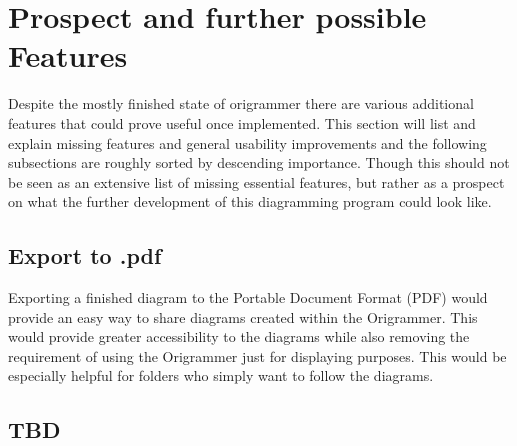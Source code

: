 
\section{Prospect and further possible Features}
\label{sec:prospect}

Despite the mostly finished state of \gls{origrammer} there are various additional features that could prove useful once implemented. This section will list and explain missing features and general usability improvements and the following subsections are roughly sorted by descending importance. Though this should not be seen as an extensive list of missing essential features, but rather as a prospect on what the further development of this diagramming program could look like. 

\subsection{Export to .pdf}

Exporting a finished diagram to the Portable Document Format (PDF) would provide an easy way to share diagrams created within the Origrammer. This would provide greater accessibility to the diagrams while also removing the requirement of using the Origrammer just for displaying purposes. This would be especially helpful for folders who simply want to follow the diagrams.

\subsection{TBD}